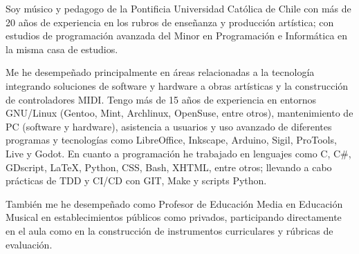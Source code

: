 

\begin{cvparagraph}

Soy músico y pedagogo de la Pontificia Universidad
Católica de Chile con más de 20 años de experiencia en los
rubros de enseñanza y producción artística; con estudios
de programación avanzada del Minor en Programación e
Informática en la misma casa de estudios.

Me he desempeñado principalmente en áreas relacionadas a
la tecnología integrando soluciones de software y hardware
a obras artísticas y la construcción de controladores
MIDI. Tengo más de 15 años de experiencia en entornos
GNU/Linux (Gentoo, Mint, Archlinux, OpenSuse, entre
otros), mantenimiento de PC (software y hardware),
asistencia a usuarios y uso avanzado de diferentes
programas y tecnologías como LibreOffice, Inkscape,
Arduino, Sigil, ProTools, Live y Godot. En cuanto a
programación he trabajado en lenguajes como C, C\#,
GDscript, LaTeX, Python, CSS, Bash, XHTML, entre otros;
llevando a cabo prácticas de TDD y CI/CD con GIT, Make y
scripts Python.

También me he desempeñado como Profesor de Educación Media
en Educación Musical en establecimientos públicos como
privados, participando directamente en el aula como en la
construcción de instrumentos curriculares y rúbricas de
evaluación.

\end{cvparagraph}

